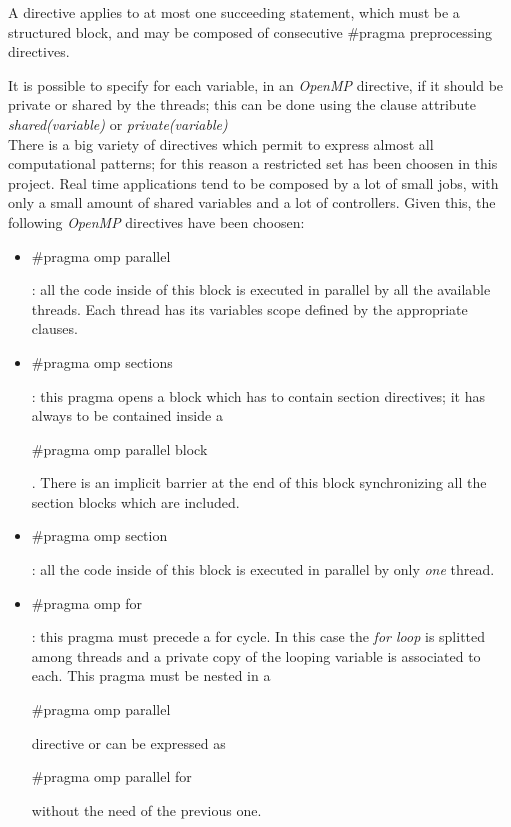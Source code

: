 \documentclass[a4paper,11pt,oneside]{book}
\begin{document}
A directive applies to at most one succeeding statement, which must be a structured block, and may be composed of consecutive $\#$pragma preprocessing directives. 

It is possible to specify for each variable, in an \emph{OpenMP} directive, if it should be private or shared by the threads; this can be done using the clause attribute \emph{shared(variable)} or \emph{private(variable)}\\
There is a big variety of directives which permit to express almost all computational patterns; for this reason a restricted set has been choosen in this project. Real time applications tend to be composed by a lot of small jobs, with only a small amount of shared variables and a lot of controllers. Given this, the following \emph{OpenMP} directives have been choosen:
\begin{itemize}
\item{\begin{bf}{$\#$pragma omp parallel}\end{bf} : all the code inside of this block is executed in parallel by all the available threads. Each thread has its variables scope defined by the appropriate clauses. }
\item{\begin{bf}{$\#$pragma omp sections}\end{bf} : this pragma opens a block which has to contain section directives; it has always to be contained inside a \begin{bf}$\#$pragma omp parallel block\end{bf}. There is an implicit barrier at the end of this block synchronizing all the section blocks which are included. }
\item{\begin{bf}{$\#$pragma omp section}\end{bf} : all the code inside of this block is executed in parallel by only \emph{one} thread. }
\item{\begin{bf}{$\#$pragma omp for}\end{bf} : this pragma must precede a for cycle. In this case the \emph{for loop} is splitted among  threads and a private copy of the looping variable is associated to each. This pragma must be nested in a \begin{bf}$\#$pragma omp parallel\end{bf} directive or can be expressed as \begin{bf}{$\#$pragma omp parallel for}\end{bf} without the need of the previous one.  }

\end{itemize}
\end{document}
